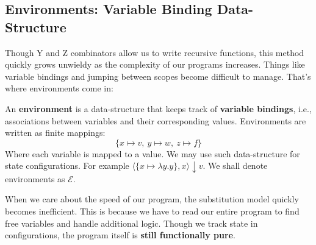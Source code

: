 \subsection{Environments: Variable Binding Data-Structure}
\noindent
Though Y and Z combinators allow us to write recursive functions, this method quickly grows unwieldy as the complexity of our programs increases.
Things like variable bindings and jumping between scopes become difficult to manage. That's where environments come in:
\begin{Def}[Environment]

    \label{def:environment}

    \noindent
    An \textbf{environment} is a data-structure that keeps track of \textbf{variable bindings}, i.e., associations between variables and their corresponding values. Environments are written as finite mappings:
    \LARGE
    \[
        \{ x \mapsto v,\ y \mapsto w,\ z \mapsto f \}
    \]
    \normalsize
    Where each variable is mapped to a value. We may use such data-structure for state configurations. For example $\langle\{x\mapsto \lambda y.y\}, x  \rangle \downarrow v$. We shall denote environments as $\mathcal{E}$.
\end{Def}
\noindent

\begin{theo}

    When we care about the speed of our program, the substitution model quickly becomes inefficient.
    This is because we have to read our entire program to find free variables and handle additional logic.
    Though we track state in configurations, the program itself is \textbf{still functionally pure}.
\end{theo}

